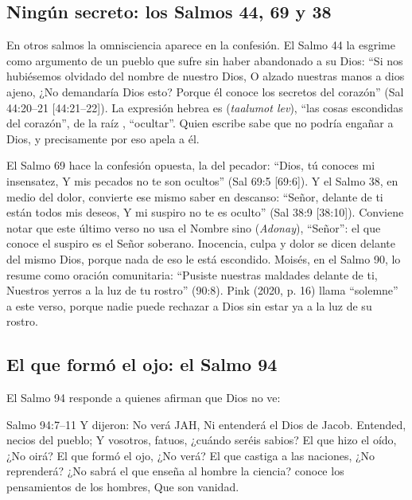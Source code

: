 \subsection{Ningún secreto: los Salmos 44, 69 y 38}
En otros salmos la omnisciencia aparece en la confesión. El Salmo 44 la esgrime como argumento de un pueblo que sufre sin haber abandonado a su Dios: ``Si nos hubiésemos olvidado del nombre de nuestro Dios, O alzado nuestras manos a dios ajeno, ¿No demandaría Dios esto? Porque él conoce los secretos del corazón'' (Sal 44:20--21 [44:21--22]). La expresión hebrea es  (\emph{taalumot lev}), ``las cosas escondidas del corazón'', de la raíz , ``ocultar''. Quien escribe sabe que no podría engañar a Dios, y precisamente por eso apela a él.

El Salmo 69 hace la confesión opuesta, la del pecador: ``Dios, tú conoces mi insensatez, Y mis pecados no te son ocultos'' (Sal 69:5 [69:6]). Y el Salmo 38, en medio del dolor, convierte ese mismo saber en descanso: ``Señor, delante de ti están todos mis deseos, Y mi suspiro no te es oculto'' (Sal 38:9 [38:10]). Conviene notar que este último verso no usa el Nombre sino  (\emph{Adonay}), ``Señor'': el que conoce el suspiro es el Señor soberano. Inocencia, culpa y dolor se dicen delante del mismo Dios, porque nada de eso le está escondido. Moisés, en el Salmo 90, lo resume como oración comunitaria: ``Pusiste nuestras maldades delante de ti, Nuestros yerros a la luz de tu rostro'' (90:8). Pink (2020, p. 16) llama ``solemne'' a este verso, porque nadie puede rechazar a Dios sin estar ya a la luz de su rostro.

\subsection{El que formó el ojo: el Salmo 94}
El Salmo 94 responde a quienes afirman que Dios no ve:

\begin{verso}{Salmo 94:7–11}
Y dijeron: No verá JAH, Ni entenderá el Dios de Jacob. Entended, necios del pueblo; Y vosotros, fatuos, ¿cuándo seréis sabios? El que hizo el oído, ¿No oirá? El que formó el ojo, ¿No verá? El que castiga a las naciones, ¿No reprenderá? ¿No sabrá el que enseña al hombre la ciencia? \SENOR{} conoce los pensamientos de los hombres, Que son vanidad.
\end{verso}

